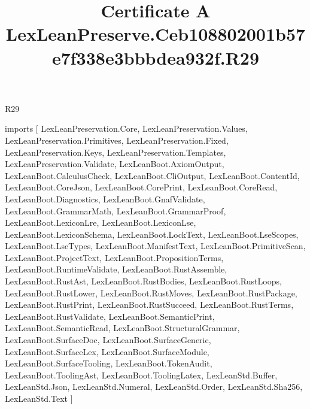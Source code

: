 \begin{lexlean}{R29}
\title{Certificate A LexLeanPreserve.Ceb108802001b57e7f338e3bbbdea932f.R29}
\begin{coremodule}
imports [
  LexLeanPreservation.Core,
  LexLeanPreservation.Values,
  LexLeanPreservation.Primitives,
  LexLeanPreservation.Fixed,
  LexLeanPreservation.Keys,
  LexLeanPreservation.Templates,
  LexLeanPreservation.Validate,
  LexLeanBoot.AxiomOutput,
  LexLeanBoot.CalculusCheck,
  LexLeanBoot.CliOutput,
  LexLeanBoot.ContentId,
  LexLeanBoot.CoreJson,
  LexLeanBoot.CorePrint,
  LexLeanBoot.CoreRead,
  LexLeanBoot.Diagnostics,
  LexLeanBoot.GnafValidate,
  LexLeanBoot.GrammarMath,
  LexLeanBoot.GrammarProof,
  LexLeanBoot.LexiconLre,
  LexLeanBoot.LexiconLse,
  LexLeanBoot.LexiconSchema,
  LexLeanBoot.LockText,
  LexLeanBoot.LseScopes,
  LexLeanBoot.LseTypes,
  LexLeanBoot.ManifestText,
  LexLeanBoot.PrimitiveScan,
  LexLeanBoot.ProjectText,
  LexLeanBoot.PropositionTerms,
  LexLeanBoot.RuntimeValidate,
  LexLeanBoot.RustAssemble,
  LexLeanBoot.RustAst,
  LexLeanBoot.RustBodies,
  LexLeanBoot.RustLoops,
  LexLeanBoot.RustLower,
  LexLeanBoot.RustMoves,
  LexLeanBoot.RustPackage,
  LexLeanBoot.RustPrint,
  LexLeanBoot.RustSucceed,
  LexLeanBoot.RustTerms,
  LexLeanBoot.RustValidate,
  LexLeanBoot.SemanticPrint,
  LexLeanBoot.SemanticRead,
  LexLeanBoot.StructuralGrammar,
  LexLeanBoot.SurfaceDoc,
  LexLeanBoot.SurfaceGeneric,
  LexLeanBoot.SurfaceLex,
  LexLeanBoot.SurfaceModule,
  LexLeanBoot.SurfaceTooling,
  LexLeanBoot.TokenAudit,
  LexLeanBoot.ToolingAst,
  LexLeanBoot.ToolingLatex,
  LexLeanStd.Buffer,
  LexLeanStd.Json,
  LexLeanStd.Numeral,
  LexLeanStd.Order,
  LexLeanStd.Sha256,
  LexLeanStd.Text
]


\end{coremodule}
\end{lexlean}

